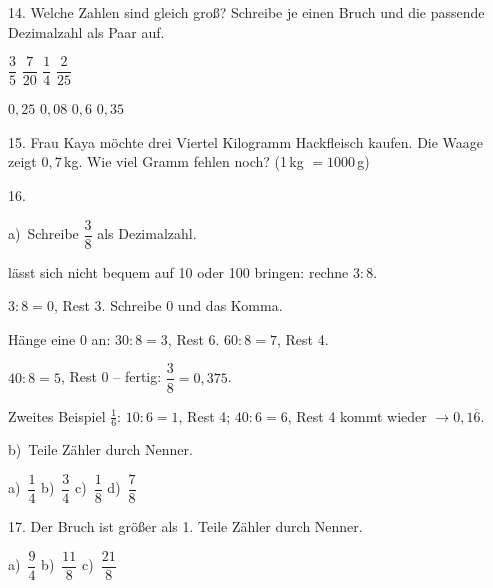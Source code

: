 \documentclass[11pt]{article}
\newcommand{\grau}[1]{{\color{mbgrau}#1}}
\begin{document}
\begin{pfaufg}{}{14.}{}
Welche Zahlen sind gleich groß? Schreibe je einen Bruch und die passende Dezimalzahl als Paar auf. \par\vspace{3pt} $\dfrac{3}{5}$ \qquad $\dfrac{7}{20}$ \qquad $\dfrac{1}{4}$ \qquad $\dfrac{2}{25}$ \par\vspace{6pt} $0{,}25$ \qquad $0{,}08$ \qquad $0{,}6$ \qquad $0{,}35$
\end{pfaufg}

\begin{pfaufg}{}{15.}{}
Frau Kaya möchte drei Viertel Kilogramm Hackfleisch kaufen. Die Waage zeigt $0{,}7$\,kg. Wie viel Gramm fehlen noch? (1\,kg $= 1000$\,g)
\end{pfaufg}

\begin{pfaufg}{}{16.}{}
\grau{a)\ Schreibe $\dfrac{3}{8}$ als Dezimalzahl.\par\smallskip 8 lässt sich nicht bequem auf 10 oder 100 bringen: rechne $3 : 8$.\par $3 : 8 = 0$, Rest 3. Schreibe 0 und das Komma.\par Hänge eine 0 an: $30 : 8 = 3$, Rest 6. \quad $60 : 8 = 7$, Rest 4.\par $40 : 8 = 5$, Rest 0 – fertig: $\dfrac{3}{8} = 0{,}375$.\par Zweites Beispiel $\frac{1}{6}$: $10 : 6 = 1$, Rest 4; $40 : 6 = 6$, Rest 4 kommt wieder $\to 0{,}1\overline{6}$.}
\par\medskip
b)\ Teile Zähler durch Nenner. \par\vspace{3pt} a)~$\dfrac{1}{4}$ \qquad b)~$\dfrac{3}{4}$ \qquad c)~$\dfrac{1}{8}$ \qquad d)~$\dfrac{7}{8}$
\end{pfaufg}

\begin{pfaufg}{}{17.}{}
Der Bruch ist größer als 1. Teile Zähler durch Nenner. \par\vspace{3pt} a)~$\dfrac{9}{4}$ \qquad b)~$\dfrac{11}{8}$ \qquad c)~$\dfrac{21}{8}$
\end{pfaufg}
\end{document}
